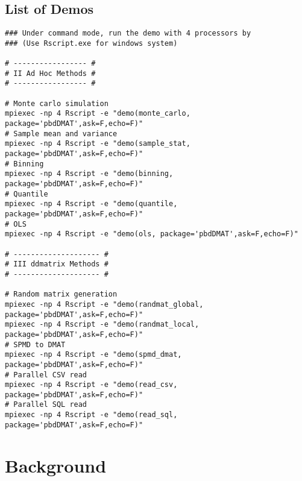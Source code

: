 \subsection{List of Demos}

\begin{lstlisting}[title=Shell Script]
### Under command mode, run the demo with 4 processors by
### (Use Rscript.exe for windows system)

# ----------------- #
# II Ad Hoc Methods #
# ----------------- #

# Monte carlo simulation
mpiexec -np 4 Rscript -e "demo(monte_carlo, package='pbdDMAT',ask=F,echo=F)"
# Sample mean and variance
mpiexec -np 4 Rscript -e "demo(sample_stat, package='pbdDMAT',ask=F,echo=F)"
# Binning
mpiexec -np 4 Rscript -e "demo(binning, package='pbdDMAT',ask=F,echo=F)"
# Quantile
mpiexec -np 4 Rscript -e "demo(quantile, package='pbdDMAT',ask=F,echo=F)"
# OLS
mpiexec -np 4 Rscript -e "demo(ols, package='pbdDMAT',ask=F,echo=F)"

# -------------------- #
# III ddmatrix Methods #
# -------------------- #

# Random matrix generation
mpiexec -np 4 Rscript -e "demo(randmat_global, package='pbdDMAT',ask=F,echo=F)"
mpiexec -np 4 Rscript -e "demo(randmat_local, package='pbdDMAT',ask=F,echo=F)"
# SPMD to DMAT
mpiexec -np 4 Rscript -e "demo(spmd_dmat, package='pbdDMAT',ask=F,echo=F)"
# Parallel CSV read
mpiexec -np 4 Rscript -e "demo(read_csv, package='pbdDMAT',ask=F,echo=F)"
# Parallel SQL read
mpiexec -np 4 Rscript -e "demo(read_sql, package='pbdDMAT',ask=F,echo=F)"
\end{lstlisting}













\section{Background}
\label{sec:bg}



% 

